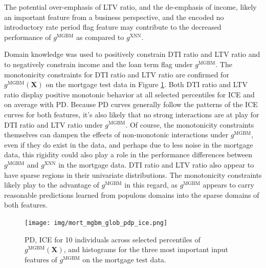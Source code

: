 \documentclass[information,article,submit,moreauthors,pdftex]{definitions/mdpi}
\begin{document}
\noindent The potential over-emphasis of LTV ratio, and the de-emphasis of income, likely an important feature from a business perspective, and the encoded no introductory rate period flag feature may contribute to the decreased performance of $g^\text{MGBM}$ as compared to $g^\text{XNN}$.

Domain knowledge was used to positively constrain DTI ratio and LTV ratio and to negatively constrain income and the loan term flag under $g^\text{MGBM}$. The monotonicity constraints for DTI ratio and LTV ratio are confirmed for $g^\text{MGBM}(\mathbf{X})$ on the mortgage test data in Figure \ref{fig:mort_mgbm_glob_pdp_ice}. Both DTI ratio and LTV ratio display positive monotonic behavior at all selected percentiles for ICE and on average with PD. Because PD curves generally follow the patterns of the ICE curves for both features, it's also likely that no strong interactions are at play for DTI ratio and LTV ratio under $g^\text{MGBM}$. Of course, the monotonicity constraints themselves can dampen the effects of non-monotonic interactions under $g^\text{MGBM}$, even if they do exist in the data, and perhaps due to less noise in the mortgage data, this rigidity could also play a role in the performance differences between $g^\text{MGBM}$ and $g^\text{XNN}$ in the mortgage data. DTI ratio and LTV ratio also appear to have sparse regions in their univariate distributions. The monotonicity constraints likely play to the advantage of $g^\text{MGBM}$ in this regard, as $g^\text{MGBM}$ appears to carry reasonable predictions learned from populous domains into the sparse domains of both features. 

\begin{figure}[H]
\centering
\texttt{[image: img/mort\_mgbm\_glob\_pdp\_ice.png]}
\caption{PD, ICE for 10 individuals across selected percentiles of $g^\text{MGBM}(\mathbf{X})$, and histograms for the three most important input features of $g^\text{MGBM}$ on the mortgage test data.}
\label{fig:mort_mgbm_glob_pdp_ice}
\end{figure}   
\end{document}
